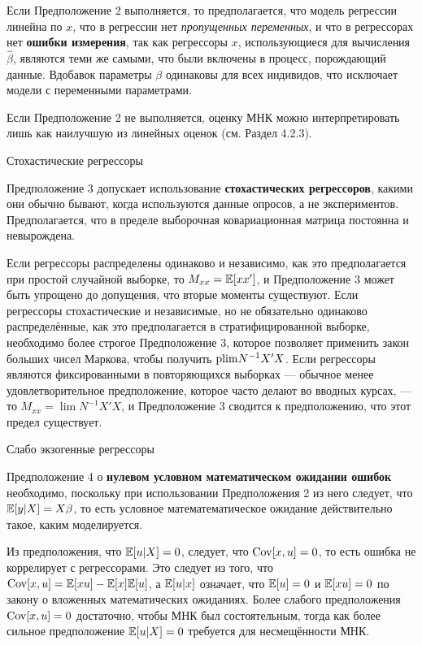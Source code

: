 Если Предположение 2 выполняется, то предполагается, что модель регрессии линейна по $x$, что в регрессии нет \textit{пропущенных переменных}, и что в регрессорах нет \textbf{ошибки измерения}, так как регрессоры $x$, использующиеся для вычисления $\hat{\beta}$, являются теми же самыми, что были включены в процесс, порождающий данные. Вдобавок параметры $\beta$ одинаковы для всех индивидов, что исключает модели с переменными параметрами. 

Если Предположение 2 не выполняется, оценку МНК можно интерпретировать лишь как наилучшую из линейных оценок (см. Раздел 4.2.3).

\begin{center}
 Стохастические регрессоры
 \end{center} 
 
Предположение 3 допускает использование \textbf{стохастических регрессоров}, какими они обычно бывают, когда используются данные опросов, а не экспериментов. Предполагается, что в пределе выборочная ковариационная матрица постоянна и невырождена.

Если регрессоры распределены одинаково и независимо, как это предполагается при простой случайной выборке, то $M_{xx}=\mathbb{E}[xx']$, и Предположение 3 может быть упрощено до допущения, что вторые моменты существуют. Если регрессоры стохастические и независимые, но не обязательно одинаково распределённые, как это предполагается в стратифицированной выборке, необходимо более строгое Предположение 3, которое позволяет применить закон больших чисел Маркова, чтобы получить $\mathrm{plim } N^{-1}X'X$. Если регрессоры являются фиксированными в повторяющихся выборках --- обычное менее удовлетворительное предположение, которое часто делают во вводных курсах, --- то $M_{xx} = \lim N^{-1}X'X$, и Предположение 3 сводится к предположению, что этот предел существует.
 
 
\begin{center}
 Слабо экзогенные регрессоры
 \end{center} 
 
Предположение 4 о \textbf{нулевом условном математическом ожидании ошибок} необходимо, поскольку при использовании Предположения 2 из него следует, что $\mathbb{E}[y|X] = X\beta$, то есть условное математематическое ожидание действительно такое, каким моделируется.

Из предположения, что $\mathbb{E}[u|X]=0$, следует, что $\mathrm{Cov}[x,u]=0$, то есть ошибка не коррелирует с регрессорами. Это следует из того, что $\mathrm{Cov}[x,u] = \mathbb{E}[xu]-\mathbb{E}[x]\mathbb{E}[u]$, а $\mathbb{E}[u|x]$ означает, что $\mathbb{E}[u]=0$ и $\mathbb{E}[xu]=0$ по закону о вложенных математических ожиданиях. Более слабого предположения $\mathrm{Cov}[x,u]=0$ достаточно, чтобы МНК был состоятельным, тогда как более сильное предположение  $\mathbb{E}[u|X]=0$ требуется для несмещённости МНК.

